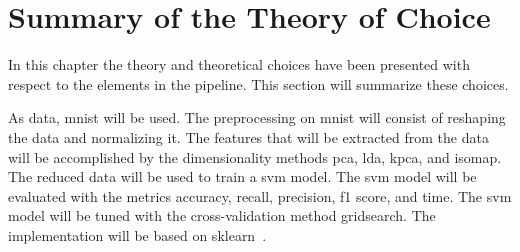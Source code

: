 \section{Summary of the Theory of Choice}\label{sec:theory-choice-summary}
In this chapter the theory and theoretical choices have been presented with respect to the elements in the pipeline. This section will summarize these choices. 


As data, \gls{mnist} will be used. The preprocessing on \gls{mnist} will consist of reshaping the data and normalizing it. The features that will be extracted from the data will be accomplished by the dimensionality methods \gls{pca}, \gls{lda}, \gls{kpca}, and \gls{isomap}. The reduced data will be used to train a \gls{svm} model. The \gls{svm} model will be evaluated with the metrics accuracy, recall, precision, f1 score, and time. The \gls{svm} model will be tuned with the cross-validation method gridsearch. The implementation will be based on \gls{sklearn}~\cite{scikit-learn}. 